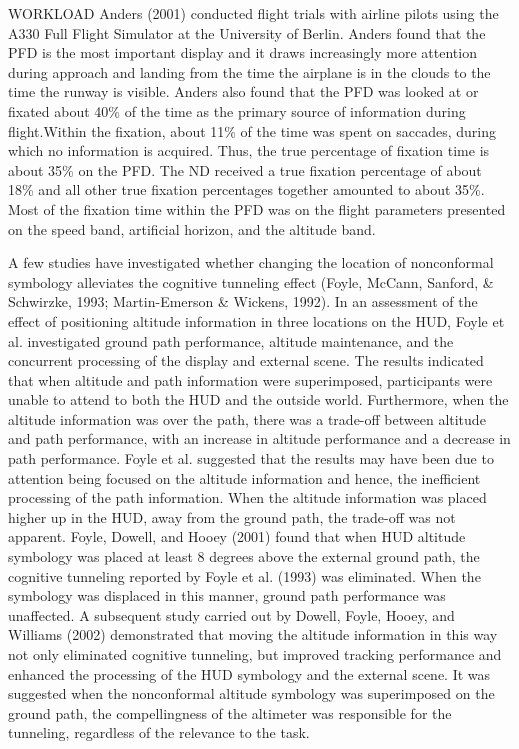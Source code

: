 \documentclass[utf8,bachelor,manualbib]{gradu3}
\begin{document}
WORKLOAD
Anders (2001) conducted flight trials with airline pilots using the A330 Full Flight
Simulator at the University of Berlin. Anders found that the PFD is the most important
display and it draws increasingly more attention during approach and landing
from the time the airplane is in the clouds to the time the runway is visible. Anders
also found that the PFD was looked at or fixated about 40\% of the time as the
primary source of information during flight.Within the fixation, about 11\% of the
time was spent on saccades, during which no information is acquired. Thus, the
true percentage of fixation time is about 35\% on the PFD. The ND received a true
fixation percentage of about 18\% and all other true fixation percentages together
amounted to about 35\%. Most of the fixation time within the PFD was on the flight
parameters presented on the speed band, artificial horizon, and the altitude band. \citep{schnell2004}

A few studies have investigated whether changing the location of nonconformal
symbology alleviates the cognitive tunneling effect (Foyle, McCann, Sanford, \&
Schwirzke, 1993; Martin-Emerson \& Wickens, 1992). In an assessment of the
effect of positioning altitude information in three locations on the HUD, Foyle et
al. investigated ground path performance, altitude maintenance, and the concurrent
processing of the display and external scene. The results indicated that
when altitude and path information were superimposed, participants were unable
to attend to both the HUD and the outside world. Furthermore, when the altitude
information was over the path, there was a trade-off between altitude and path
performance, with an increase in altitude performance and a decrease in path
performance. Foyle et al. suggested that the results may have been due to attention
being focused on the altitude information and hence, the inefficient processing
of the path information. When the altitude information was placed higher up
in the HUD, away from the ground path, the trade-off was not apparent.
Foyle, Dowell, and Hooey (2001) found that when HUD altitude symbology
was placed at least 8 degrees above the external ground path, the cognitive tunneling reported
by Foyle et al. (1993) was eliminated. When the symbology was displaced
in this manner, ground path performance was unaffected. A subsequent
study carried out by Dowell, Foyle, Hooey, and Williams (2002) demonstrated
that moving the altitude information in this way not only eliminated cognitive
tunneling, but improved tracking performance and enhanced the processing of
the HUD symbology and the external scene. It was suggested when the
nonconformal altitude symbology was superimposed on the ground path, the
compellingness of the altimeter was responsible for the tunneling, regardless of
the relevance to the task. \citep{crawford2006}
\end{document}
